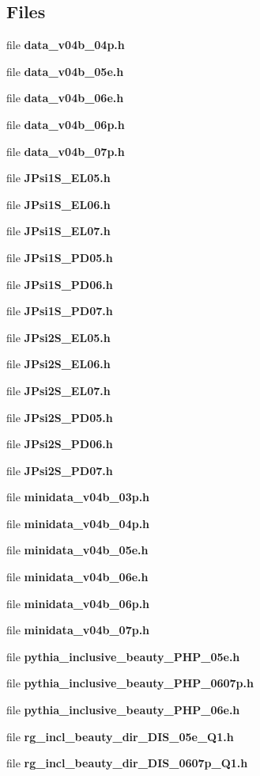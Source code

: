 \subsection*{Files}
\begin{CompactItemize}
\item 
file \textbf{data\_\-v04b\_\-04p.h}
\item 
file \textbf{data\_\-v04b\_\-05e.h}
\item 
file \textbf{data\_\-v04b\_\-06e.h}
\item 
file \textbf{data\_\-v04b\_\-06p.h}
\item 
file \textbf{data\_\-v04b\_\-07p.h}
\item 
file \textbf{JPsi1S\_\-EL05.h}
\item 
file \textbf{JPsi1S\_\-EL06.h}
\item 
file \textbf{JPsi1S\_\-EL07.h}
\item 
file \textbf{JPsi1S\_\-PD05.h}
\item 
file \textbf{JPsi1S\_\-PD06.h}
\item 
file \textbf{JPsi1S\_\-PD07.h}
\item 
file \textbf{JPsi2S\_\-EL05.h}
\item 
file \textbf{JPsi2S\_\-EL06.h}
\item 
file \textbf{JPsi2S\_\-EL07.h}
\item 
file \textbf{JPsi2S\_\-PD05.h}
\item 
file \textbf{JPsi2S\_\-PD06.h}
\item 
file \textbf{JPsi2S\_\-PD07.h}
\item 
file \textbf{minidata\_\-v04b\_\-03p.h}
\item 
file \textbf{minidata\_\-v04b\_\-04p.h}
\item 
file \textbf{minidata\_\-v04b\_\-05e.h}
\item 
file \textbf{minidata\_\-v04b\_\-06e.h}
\item 
file \textbf{minidata\_\-v04b\_\-06p.h}
\item 
file \textbf{minidata\_\-v04b\_\-07p.h}
\item 
file \textbf{pythia\_\-inclusive\_\-beauty\_\-PHP\_\-05e.h}
\item 
file \textbf{pythia\_\-inclusive\_\-beauty\_\-PHP\_\-0607p.h}
\item 
file \textbf{pythia\_\-inclusive\_\-beauty\_\-PHP\_\-06e.h}
\item 
file \textbf{rg\_\-incl\_\-beauty\_\-dir\_\-DIS\_\-05e\_\-Q1.h}
\item 
file \textbf{rg\_\-incl\_\-beauty\_\-dir\_\-DIS\_\-0607p\_\-Q1.h}

\end{CompactItemize}
